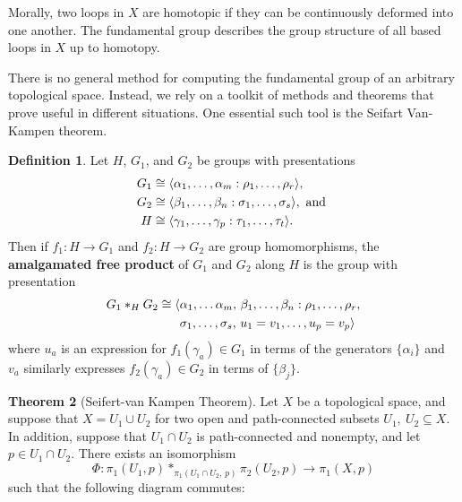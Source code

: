 \documentclass[12pt,twoside]{reedthesis}
\theoremstyle{definition}
\newtheorem{thm}{Theorem}[chapter]
\newtheorem{defn}[thm]{Definition}
\newcommand{\defnphrase}[1]{\textbf{#1}}
\DeclarePairedDelimiter\ang{\langle}{\rangle}
\begin{document}
Morally, two loops in $X$ are homotopic if they can be continuously deformed into one another.
The fundamental group describes the group structure of all based loops in $X$ up to homotopy.

There is no general method for computing the fundamental group of an arbitrary topological space.
Instead, we rely on a toolkit of methods and theorems that prove useful in different situations.
One essential such tool is the Seifart Van-Kampen theorem.

\begin{defn}
  Let $H$, $G_1$, and $G_2$ be groups with presentations
  \begin{align*}
    G_1 &\cong \ang{\alpha_1, \dots, \alpha_m : \rho_1, \dots, \rho_r}, \\
    G_2 &\cong \ang{\beta_1, \ldots, \beta_n : \sigma_1, \ldots, \sigma_s}, \text{ and } \\
    H &\cong \ang{\gamma_1, \ldots, \gamma_p : \tau_1, \ldots, \tau_t}.
  \end{align*}
  Then if $f_1 : H \to G_1$ and $f_2 : H \to G_2$ are group homomorphisms, the \defnphrase{amalgamated free product} of $G_1$ and $G_2$ along $H$ is the group with presentation
  \begin{align*}
    G_1 \ast_H G_2 \cong \ang{&\alpha_1, \ldots \alpha_m,\, \beta_1, \ldots, \beta_n : \rho_1, \ldots, \rho_r, \\
    &\sigma_1, \ldots, \sigma_s,\, u_1 = v_1,\ldots, u_p = v_p}
  \end{align*}
  where $u_a$ is an expression for $f_1(\gamma_a) \in G_1$ in terms of the generators $\{\alpha_i\}$ and $v_a$ similarly expresses $f_2(\gamma_a) \in G_2$ in terms of $\{\beta_j\}$.
\end{defn}

\begin{thm}[Seifert-van Kampen Theorem]
  Let $X$ be a topological space, and suppose that $X = U_1 \cup U_2$ for two open and path-connected subsets $U_1,\ U_2 \subseteq X$. 
  In addition, suppose that $U_1 \cap U_2$ is path-connected and nonempty, and let $p \in U_1 \cap U_2$.
  There exists an isomorphism
  \begin{equation*}
    \Phi : \pi_1(U_1, p) \ast_{\pi_1(U_1 \cap U_2,\, p)} \pi_2(U_2, p) \to \pi_1(X, p)
  \end{equation*}
  such that the following diagram commutes:
  \begin{center}
  \end{center}
\end{thm}
\end{document}
